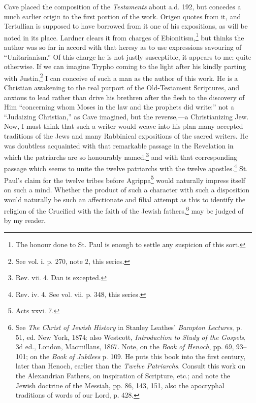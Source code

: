 Cave placed the composition of the \emph{Testaments} about a.d. 192, but concedes a much earlier origin to the first portion of the work. Origen quotes from it, and Tertullian is supposed to have borrowed from it one of his expositions, as will be noted in its place. Lardner clears it from charges of Ebionitism,\footnote{The honour done to St. Paul is enough to settle any suspicion of this sort.} but thinks the author was so far in accord with that heresy as to use expressions savouring of “Unitarianism.” Of this charge he is not justly susceptible, it appears to me: quite otherwise. If we can imagine Trypho coming to the light after his kindly parting with Justin,\footnote{See vol. i. p. 270, note 2, this series.} I can conceive of such a man as the author of this work. He is a Christian awakening to the real purport of the Old-Testament Scriptures, and anxious to lead rather than drive his brethren after the flesh to the discovery of Him “concerning whom Moses in the law and the prophets did write:” not a “Judaizing Christian,” as Cave imagined, but the reverse,—a Christianizing Jew. Now, I must think that such a writer would weave into his plan many accepted traditions of the Jews and many Rabbinical expositions of the sacred writers. He was doubtless acquainted with that remarkable passage in the Revelation in which the patriarchs are so honourably named,\footnote{Rev. vii. 4. Dan is excepted.} and with that corresponding passage which seems to unite the twelve patriarchs with the twelve apostles.\footnote{Rev. iv. 4. See vol. vii. p. 348, this series.} St. Paul’s claim for the twelve tribes before Agrippa\footnote{Acts xxvi. 7.} would naturally impress itself on such a mind. Whether the product of such a character with such a disposition would naturally be such an affectionate and filial attempt as this to identify the religion of the Crucified with the faith of the Jewish fathers,\footnote{See \emph{The Christ of Jewish History} in Stanley Leathes’ \emph{Bampton Lectures}, p. 51, ed. New York, 1874; also Westcott, \emph{Introduction to Study of the Gospels}, 3d ed., London, Macmillans, 1867. Note, on the \emph{Book of Henoch}, pp. 69, 93–101; on the \emph{Book of Jubilees} p. 109. He puts this book into the first century, later than Henoch, earlier than the \emph{Twelve Patriarchs}. Consult this work on the Alexandrian Fathers, on inspiration of Scripture, etc.; and note the Jewish doctrine of the Messiah, pp. 86, 143, 151, also the apocryphal traditions of words of our Lord, p. 428.} may be judged of by my reader.

